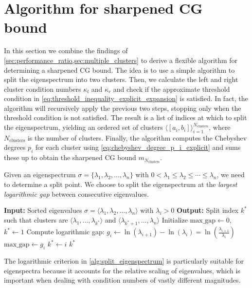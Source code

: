 \section{Algorithm for sharpened CG bound}\label{sec:cg_sharpened_convrate_multiple_clusters_algorithm}
In this section we combine the findings of \cref{sec:performance_ratio,sec:multiple_clusters} to derive a flexible algorithm for determining a sharpened CG bound. The idea is to use a simple algorithm to split the eigenspectrum into two clusters. Then, we calculate the left and right cluster condition numbers $\kappa_l$ and $\kappa_r$ and check if the approximate threshold condition in \cref{eq:threshold_inequality_explicit_expansion} is satisfied. In fact, the algorithm will recursively apply the previous two steps, stopping only when the threshold condition is not satisfied. The result is a list of indices at which to split the eigenspectrum, yielding an ordered set of clusters $\langle[a_i, b_i]\rangle_{i=1}^{N_{\text{clusters}}}$, where $N_{\text{clusters}}$ is the number of clusters. Finally, the algorithm computes the Chebyshev degrees $p_i$ for each cluster using \cref{eq:chebyshev_degree_p_i_explicit} and sums these up to obtain the sharpened CG bound $m_{N_{\text{clusters}}}$.

Given an eigenspectrum $\sigma = \{\lambda_1, \lambda_2, \ldots, \lambda_n\}$ with $0 < \lambda_1 \leq \lambda_2 \leq \cdots \leq \lambda_n$, we need to determine a split point. We choose to split the eigenspectrum at the \textit{largest logarithmic gap} between consecutive eigenvalues.
\begin{algorithm}[H]
    \caption{$\operatorname{SplitEigenspectrum}(\sigma)$}
    \begin{algorithmic}[1]
        \State \textbf{Input:} Sorted eigenvalues $\sigma = \langle\lambda_1, \lambda_2, \ldots, \lambda_n\rangle$ with $\lambda_i > 0$
        \State \textbf{Output:} Split index $k^*$ such that clusters are $\langle\lambda_1, \ldots, \lambda_{k^*}\rangle$ and $\langle\lambda_{k^*+1}, \ldots, \lambda_n\rangle$
        \State Initialize $\text{max\_gap} \gets 0$, $k^* \gets 1$
            \State Compute logarithmic gap: $g_i \gets \ln(\lambda_{i+1}) - \ln(\lambda_i) = \ln\left(\frac{\lambda_{i+1}}{\lambda_i}\right)$
                \State $\text{max\_gap} \gets g_i$
                \State $k^* \gets i$
            \EndIf
        \EndFor
        \State \Return $k^*$
    \end{algorithmic}
    \label{alg:split_eigenspectrum}
\end{algorithm}
The logarithmic criterion in \cref{alg:split_eigenspectrum} is particularly suitable for eigenspectra because it accounts for the relative scaling of eigenvalues, which is important when dealing with condition numbers of vastly different magnitudes.

